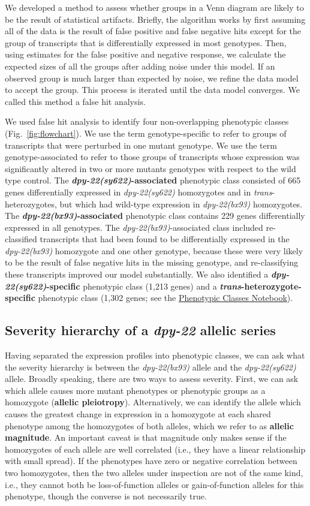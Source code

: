 \documentclass[9pt,twocolumn,twoside]{gsajnl}
\newcommand{\gene}[1]{\mbox{\emph{#1}}}
\newcommand{\dpy}[1]{\gene{dpy-22#1}}
\newcommand{\bx}{\dpy{(bx93)}}
\newcommand{\sy}{\dpy{(sy622)}}
\begin{document}
We developed a method to assess whether groups in a Venn diagram are likely to
be the result of statistical artifacts. Briefly, the algorithm works by first
assuming all of the data is the result of false positive and false negative hits
except for the group of transcripts that is differentially expressed in most
genotypes. Then, using estimates for the false positive and negative response,
we calculate the expected sizes of all the groups after adding noise under this
model. If an observed group is much larger than expected by noise, we refine the
data model to accept the group. This process is iterated until the data model
converges. We called this method a false hit analysis.

We used false hit analysis to identify four non-overlapping phenotypic classes
(Fig.~\ref{fig:flowchart}). We use the term genotype-specific to refer to groups
of transcripts that were perturbed in one mutant genotype. We use the term
genotype-associated to refer to those groups of transcripts whose expression was
significantly altered in two or more mutants genotypes with respect to the wild
type control. The \textbf{\sy{}-associated} phenotypic class consisted of 665
genes differentially expressed in \sy{} homozygotes and in
\emph{trans}-heterozygotes, but which had wild-type expression in \bx{}
homozygotes. The \textbf{\bx{}-associated} phenotypic class contains 229 genes
differentially expressed in all genotypes. The \bx{}-associated class included
re-classified transcripts that had been found to be differentially expressed in
the \bx{} homozygote and one other genotype, because these were very likely to
be the result of false negative hits in the missing genotype, and re-classifying
these transcripts improved our model substantially. We also identified a
\textbf{\sy{}-specific} phenotypic class (1,213 genes) and a
\textbf{\emph{trans}-heterozygote-specific} phenotypic class (1,302 genes; see
the
\href{https://wormlabcaltech.github.io/med-cafe/notebook/phenotypic_classes.html}{
Phenotypic Classes Notebook}).

\subsection*{Severity hierarchy of a \gene{dpy-22} allelic series}
Having separated the expression profiles into phenotypic classes, we can ask
what the severity hierarchy is between the \bx{} allele and the \sy{} allele.
Broadly speaking, there are two ways to assess severity. First, we can ask which
allele causes more mutant phenotypes or phenotypic groups as a homozygote
(\textbf{allelic pleiotropy}). Alternatively, we can identify the allele which
causes the greatest change in expression in a homozygote at each shared
phenotype among the homozygotes of both alleles, which we refer to as
\textbf{allelic magnitude}. An important caveat is that magnitude only makes
sense if the homozygotes of each allele are well correlated (i.e., they have a
linear relationship with small spread). If the phenotypes have zero or negative
correlation between two homozygotes, then the two alleles under inspection are
not of the same kind, i.e., they cannot both be loss-of-function alleles or
gain-of-function alleles for this phenotype, though the converse is not
necessarily true.
\end{document}
